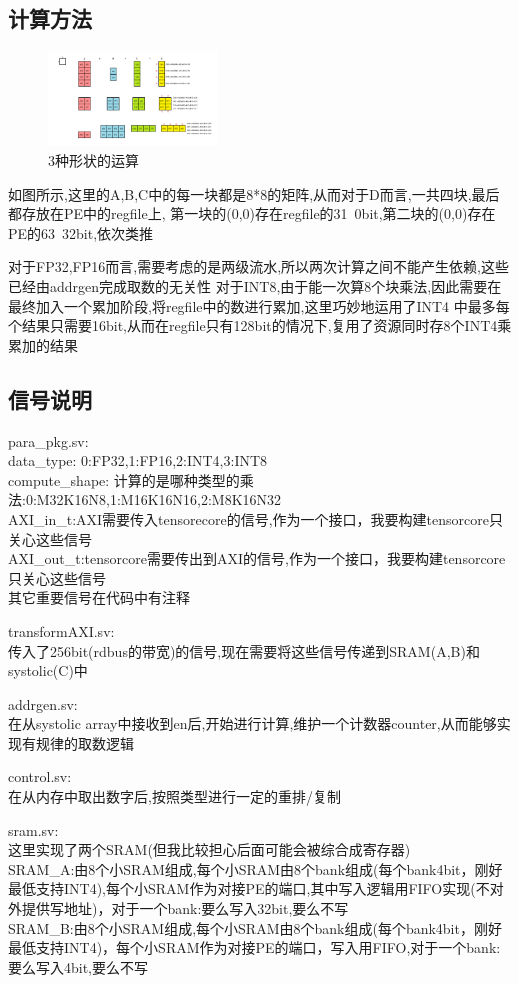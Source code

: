 \documentclass[zihao=-4, UTF8]{ctexart}
\begin{document}
\subsection{计算方法}
\begin{figure}[H]
      \centering
      \includegraphics[width=0.4\textwidth]{计算.png}
      \caption{3种形状的运算}
      \label{fig:compute}
    \end{figure}
如图所示,这里的A,B,C中的每一块都是8*8的矩阵,从而对于D而言,一共四块,最后都存放在PE中的regfile上,
第一块的(0,0)存在regfile的31~0bit,第二块的(0,0)存在PE的63~32bit,依次类推


对于FP32,FP16而言,需要考虑的是两级流水,所以两次计算之间不能产生依赖,这些已经由addrgen完成取数的无关性
对于INT8,由于能一次算8个块乘法,因此需要在最终加入一个累加阶段,将regfile中的数进行累加,这里巧妙地运用了INT4
中最多每个结果只需要16bit,从而在regfile只有128bit的情况下,复用了资源同时存8个INT4乘累加的结果

\subsection{信号说明}
para\_pkg.sv:\\
data\_type: 0:FP32,1:FP16,2:INT4,3:INT8\\
compute\_shape: 计算的是哪种类型的乘法:0:M32K16N8,1:M16K16N16,2:M8K16N32\\
AXI\_in\_t:AXI需要传入tensorecore的信号,作为一个接口，我要构建tensorcore只关心这些信号\\
AXI\_out\_t:tensorcore需要传出到AXI的信号,作为一个接口，我要构建tensorcore只关心这些信号\\
其它重要信号在代码中有注释

transformAXI.sv:\\
传入了256bit(rdbus的带宽)的信号,现在需要将这些信号传递到SRAM(A,B)和systolic(C)中

addrgen.sv:\\
在从systolic array中接收到en后,开始进行计算,维护一个计数器counter,从而能够实现有规律的取数逻辑

control.sv:\\
在从内存中取出数字后,按照类型进行一定的重排/复制

sram.sv:\\
这里实现了两个SRAM(但我比较担心后面可能会被综合成寄存器)\\
SRAM\_A:由8个小SRAM组成,每个小SRAM由8个bank组成(每个bank4bit，刚好最低支持INT4),每个小SRAM作为对接PE的端口,其中写入逻辑用FIFO实现(不对外提供写地址)，对于一个bank:要么写入32bit,要么不写\\
SRAM\_B:由8个小SRAM组成,每个小SRAM由8个bank组成(每个bank4bit，刚好最低支持INT4)，每个小SRAM作为对接PE的端口，写入用FIFO,对于一个bank:要么写入4bit,要么不写
\end{document}
